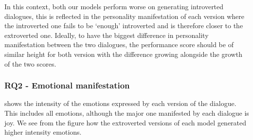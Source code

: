 \documentclass[nomenclature, english, biblatex]{kththesis}
\begin{document}
In this context, both our models perform worse on generating introverted dialogues, this is reflected in the personality manifestation of each version where the introverted one fails to be `enough' introverted and is therefore closer to the extroverted one. Ideally, to have the biggest difference in personality manifestation between the two dialogues, the performance score should be of similar height for both version with the difference growing alongside the growth of the two scores.

\subsubsection{RQ2 - Emotional manifestation}
 shows the intensity of the emotions expressed by each version of the dialogue. This includes all emotions, although the major one manifested by each dialogue is joy. We see from the figure how the extroverted versions of each model generated higher intensity emotions.
\end{document}
